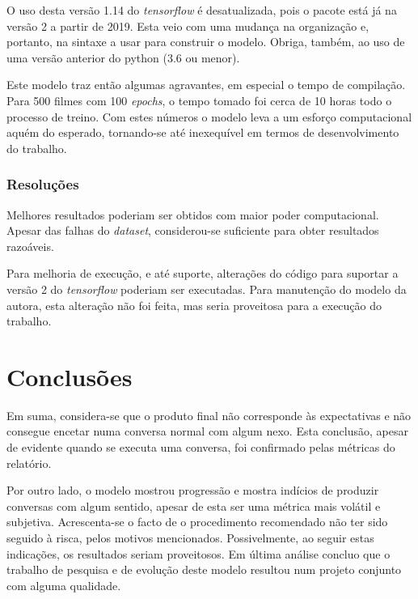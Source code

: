 \documentclass{article}
\begin{document}
O uso desta versão 1.14 do \textit{tensorflow} é desatualizada, pois o pacote está já na versão 2 a partir de 2019. Esta veio com uma mudança na organização e, portanto, na sintaxe a usar para construir o modelo. Obriga, também, ao uso de uma versão anterior do python (3.6 ou menor). 

Este modelo traz então algumas agravantes, em especial o tempo de compilação. Para 500 filmes com 100 \textit{epochs}, o tempo tomado foi cerca de 10 horas todo o processo de treino. Com estes números o modelo leva a um esforço computacional aquém do esperado, tornando-se até inexequível em termos de desenvolvimento do trabalho.

\subsubsection{Resoluções}

Melhores resultados poderiam ser obtidos com maior poder computacional. Apesar das falhas do \textit{dataset}, considerou-se suficiente para obter resultados razoáveis. 

Para melhoria de execução, e até suporte, alterações do código para suportar a versão 2 do \textit{tensorflow} poderiam ser executadas. Para manutenção do modelo da autora, esta alteração não foi feita, mas seria proveitosa para a execução do trabalho.

\section{Conclusões}
Em suma, considera-se que o produto final não corresponde às expectativas e não consegue encetar numa conversa normal com algum nexo. Esta conclusão, apesar de evidente quando se executa uma conversa, foi confirmado pelas métricas do relatório.

Por outro lado, o modelo mostrou progressão e mostra indícios de produzir conversas com algum sentido, apesar de esta ser uma métrica mais volátil e subjetiva. Acrescenta-se o facto de o procedimento recomendado não ter sido seguido à risca, pelos motivos mencionados. Possivelmente, ao seguir estas indicações, os resultados seriam proveitosos. Em última análise concluo que o trabalho de pesquisa e de evolução deste modelo resultou num projeto conjunto com alguma qualidade.




\end{document}
